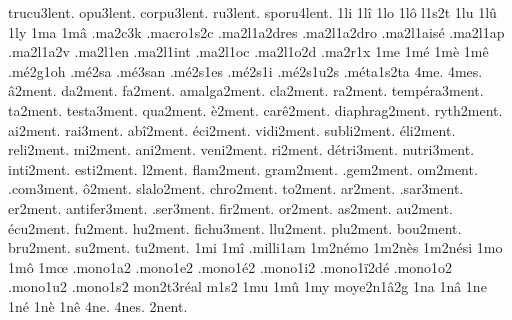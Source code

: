 { trucu3lent.
   opu3lent.
 corpu3lent.
    ru3lent.
 sporu4lent.
%
1li
1lî
1lo
1lô
l1s2t
1lu
1lû
1ly
1ma
1mâ
                    .ma2c3k
                    .macro1s2c
                    .ma2l1a2dres
                    .ma2l1a2dro
                    .ma2l1aisé
                    .ma2l1ap
                    .ma2l1a2v
                    .ma2l1en
                    .ma2l1int
                    .ma2l1oc
                    .ma2l1o2d
                    .ma2r1x %
1me
1mé
1mè
1mê
                    .mé2g1oh
                    .mé2sa %
                    .mé3san %
                    .mé2s1es
                    .mé2s1i
                    .mé2s1u2s
                    .méta1s2ta
4me.
4mes.
       â2ment.
       da2ment.
       fa2ment.
   amalga2ment.
      cla2ment.
       ra2ment.
  tempéra3ment.
       ta2ment.
    testa3ment.
      qua2ment.
        è2ment.
     carê2ment.
 diaphrag2ment.
     ryth2ment.
       ai2ment.
      rai3ment.
      abî2ment.
      éci2ment.
     vidi2ment.
    subli2ment.
      éli2ment.
     reli2ment.
       mi2ment.
      ani2ment.
     veni2ment.
       ri2ment.
    détri3ment.
    nutri3ment.
     inti2ment.
     esti2ment.
        l2ment.
     flam2ment.
     gram2ment.
     .gem2ment.
       om2ment.
     .com3ment.
        ô2ment.
    slalo2ment.
     chro2ment.
       to2ment.
       ar2ment.
     .sar3ment.
       er2ment.
  antifer3ment.
     .ser3ment.
      fir2ment.
       or2ment.
       as2ment.
       au2ment.
      écu2ment.
       fu2ment.
       hu2ment.
    fichu3ment.
      llu2ment.
      plu2ment.
      bou2ment.
      bru2ment.
       su2ment.
       tu2ment.
%
1mi
1mî
                    .milli1am
                    1m2némo
                    1m2nès
                    1m2nési
1mo
1mô
1mœ
                    .mono1a2
                    .mono1e2
                    .mono1é2
                    .mono1i2
                    .mono1ï2dé
                    .mono1o2
                    .mono1u2
                    .mono1s2
                    mon2t3réal %
m1s2
1mu
1mû
1my
                    moye2n1â2g
1na
1nâ
1ne
1né
1nè
1nê
4ne.
4nes.
      2nent. %
}
